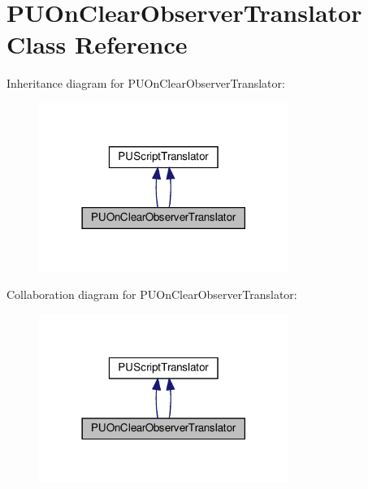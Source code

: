\hypertarget{classPUOnClearObserverTranslator}{}\section{P\+U\+On\+Clear\+Observer\+Translator Class Reference}
\label{classPUOnClearObserverTranslator}


Inheritance diagram for P\+U\+On\+Clear\+Observer\+Translator\+:
\nopagebreak
\begin{figure}[H]
\begin{center}
\leavevmode
\includegraphics[width=230pt]{classPUOnClearObserverTranslator__inherit__graph}
\end{center}
\end{figure}


Collaboration diagram for P\+U\+On\+Clear\+Observer\+Translator\+:
\nopagebreak
\begin{figure}[H]
\begin{center}
\leavevmode
\includegraphics[width=230pt]{classPUOnClearObserverTranslator__coll__graph}
\end{center}
\end{figure}
